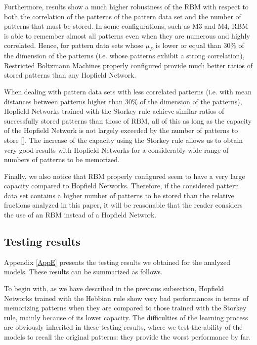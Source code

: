 \documentclass[anon]{CI}
\begin{document}
Furthermore, results show a much higher robustness of the RBM with respect to both the correlation of the patterns of the pattern data set and the number of patterns that must be stored. In some configurations, such as M3 and M4, RBM is able to remember almost all patterns even when they are numerous and highly correlated. Hence, for pattern data sets whose $\mu_P$ is lower or equal than $ 30\% $ of the dimension of the patterns (i.e. whose patterns exhibit a strong correlation), Restricted Boltzmann Machines properly configured provide much better ratios of stored patterns than any Hopfield Network.

When dealing with pattern data sets with less correlated patterns (i.e. with mean distances between patterns higher than $30\%$ of the dimension of the patterns), Hopfield Networks trained with the Storkey rule achieve similar ratios of successfully stored patterns than those of RBM, all of this as long as the capacity of the Hopfield Network is not largely exceeded by the number of patterns to store [\cite{Storkey1997}]. The increase of the capacity using the Storkey rule allows us to obtain very good results with Hopfield Networks for a considerably wide range of numbers of patterns to be memorized.

Finally, we also notice that RBM properly configured seem to have a very large capacity compared to Hopfield Networks. Therefore, if the considered pattern data set contains a higher number of patterns to be stored than the relative fractions analyzed in this paper, it will be reasonable that the reader considers the use of an RBM instead of a Hopfield Network.

\subsection{Testing results}

Appendix \ref{AppE} presents the testing results we obtained for the analyzed models. These results can be summarized as follows. 

To begin with, as we have described in the previous subsection, Hopfield Networks trained with the Hebbian rule show very bad performances in terms of memorizing patterns when they are compared to those trained with the Storkey rule, mainly because of its lower capacity. The difficulties of the learning process are obviously inherited in these testing results, where we test the ability of the models to recall the original patterns: they provide the worst performance by far.
\end{document}

